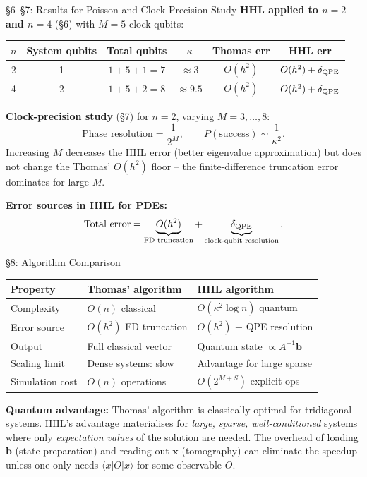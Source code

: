 \documentclass{beamer}
\begin{document}

\begin{frame}{\S6--\S7: Results for Poisson and Clock-Precision Study}
\textbf{HHL applied to $n=2$ and $n=4$} (\S6) with $M=5$ clock qubits:
\begin{center}
\small
\begin{tabular}{cccccc}
\toprule
$n$ & System qubits & Total qubits & $\kappa$ & Thomas err & HHL err \\
\midrule
2 & 1 & $1+5+1=7$ & $\approx 3$ & $O(h^2)$ & $O(h^2)+\delta_{\rm QPE}$ \\
4 & 2 & $1+5+2=8$ & $\approx 9.5$ & $O(h^2)$ & $O(h^2)+\delta_{\rm QPE}$ \\
\bottomrule
\end{tabular}
\end{center}

\medskip
\textbf{Clock-precision study} (\S7) for $n=2$, varying $M = 3,\ldots,8$:
\[
  \text{Phase resolution} = \frac{1}{2^M},
  \qquad
  P(\text{success}) \sim \frac{1}{\kappa^2}.
\]
Increasing $M$ decreases the HHL error (better eigenvalue approximation)
but does not change the Thomas' $O(h^2)$ floor -- the finite-difference
truncation error dominates for large $M$.

\medskip
\textbf{Error sources in HHL for PDEs:}
\[
  \text{Total error} = \underbrace{O(h^2)}_{\text{FD truncation}}
  + \underbrace{\delta_{\rm QPE}}_{\text{clock-qubit resolution}}.
\]
\end{frame}


\begin{frame}{\S8: Algorithm Comparison}
\begin{center}
\small
\begin{tabular}{lll}
\toprule
\textbf{Property} & \textbf{Thomas' algorithm} & \textbf{HHL algorithm} \\
\midrule
Complexity & $O(n)$ classical & $O(\kappa^2 \log n)$ quantum \\
Error source & $O(h^2)$ FD truncation & $O(h^2)$ + QPE resolution \\
Output & Full classical vector & Quantum state $\propto A^{-1}\mathbf{b}$ \\
Scaling limit & Dense systems: slow & Advantage for large sparse \\
Simulation cost & $O(n)$ operations & $O(2^{M+S})$ explicit ops \\
\bottomrule
\end{tabular}
\end{center}

\medskip
\textbf{Quantum advantage:}
Thomas' algorithm is classically optimal for tridiagonal systems.
HHL's advantage materialises for \emph{large, sparse, well-conditioned}
systems where only \emph{expectation values} of the solution are needed.
The overhead of loading $\mathbf{b}$ (state preparation) and reading out
$\mathbf{x}$ (tomography) can eliminate the speedup unless one only
needs $\langle x | O | x\rangle$ for some observable $O$.
\end{frame}
\end{document}
